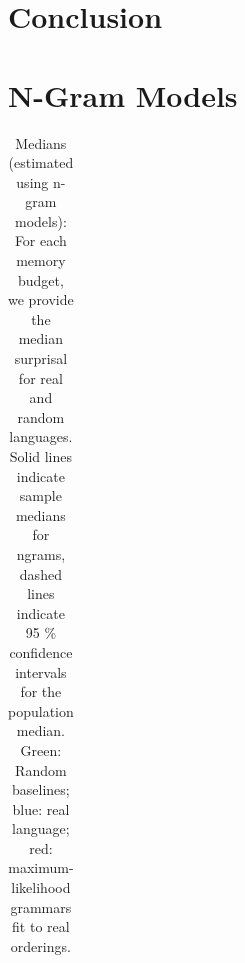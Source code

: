 \documentclass[11pt,letterpaper]{article}
\newcounter{theorem}
\newtheorem{proposition}[theorem]{Proposition}
\begin{document}
%
%
%
%
%




\section{Conclusion}





\appendix




\section{N-Gram Models}



\begin{table}
\begin{longtable}{ccccccccccccccclll}

\end{longtable}
	\caption{Medians (estimated using n-gram models): For each memory budget, we provide the median surprisal for real and random languages. Solid lines indicate sample medians for ngrams, dashed lines indicate 95 \% confidence intervals for the population median. Green: Random baselines; blue: real language; red: maximum-likelihood grammars fit to real orderings.}\label{tab:medians_ngrams}
\end{table}
\end{document}
